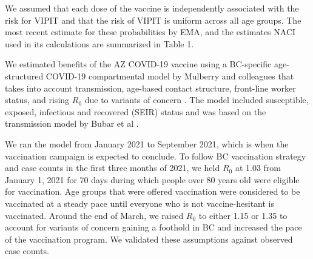 \documentclass[]{interact}
\theoremstyle{plain}%
\theoremstyle{definition}
\theoremstyle{remark}
\begin{document}
We assumed that each dose of the vaccine is independently associated
with the risk for VIPIT and that the risk of VIPIT is uniform across all
age groups. The most recent estimate for these probabilities by EMA, and
the estimates NACI used in its calculations are summarized in Table 1.

We estimated benefits of the AZ COVID-19 vaccine using a BC-specific
age-structured COVID-19 compartmental model by Mulberry and colleagues
that takes into account transmission, age-based contact structure,
front-line worker status, and rising \(R_0\) due to variants of concern
\citep{mulberry_vaccine_2021}. The model included susceptible, exposed,
infectious and recovered (SEIR) status and was based on the transmission
model by Bubar et al \citep{bubar_model-informed_2021}.

We ran the model from January 2021 to September 2021, which is when the
vaccination campaign is expected to conclude. To follow BC vaccination
strategy and case counts in the first three months of 2021, we held
\(R_0\) at 1.03 from January 1, 2021 for 70 days during which people
over 80 years old were eligible for vaccination. Age groups that were
offered vaccination were considered to be vaccinated at a steady pace
until everyone who is not vaccine-hesitant is vaccinated. Around the end
of March, we raised \(R_0\) to either 1.15 or 1.35 to account for
variants of concern gaining a foothold in BC and increased the pace of
the vaccination program. We validated these assumptions against observed
case counts.
\end{document}
